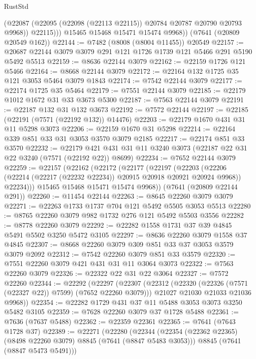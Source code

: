 \begin{lexlean}{RustStd}
\begin{coremodule}
{\begin{coremodule}
{{{{{{{{{{{{{{{{{{{{{{{{{{{{{{{{              (@22087 (@22095 (@22098 (@22113 @22115)) @20784 @20787 @20790 @20793 @9968))
              @22115)))
        @15465
        @15468
        @15471
        @15474
        @9968))
    (@7641 (@20809 @20549 @162))
@22144 := @7482 (@8008 (@8004 @11455)) @20549
@22157 := @20687 @22144 @3079 @3079 @291 @121 @1726 @1739 @121 @5466 @291 @5190 @5492 @5513
@22159 := @8636 @22144 @3079
@22162 := @22159 @1726 @121 @5466
@22164 := @8668 @22144 @3079
@22172 := @22164 @132 @1725 @35 @121 @3053 @5464 @3079 @1843
@22174 := @7542 @22144 @3079
@22177 := @22174 @1725 @35 @5464
@22179 := @7551 @22144 @3079
@22185 := @22179 @1012 @1672 @31 @33 @3673 @5300
@22187 := @7563 @22144 @3079
@22191 := @22187 @132 @31 @132 @3673
@22192 := @7572 @22144
@22197 := @22185 (@22191 (@7571 (@22192 @132)) @14476)
@22203 := @22179 @1670 @431 @31 @11 @5298 @3073
@22206 := @22159 @1670 @31 @5298
@22214 := @22164 @339 @851 @33 @31 @3053 @3570 @3079 @2185
@22217 := @22174 @851 @33 @3570
@22232 := @22179 @421 @431 @31 @11 @3240 @3073 (@22187 @22 @31 @22 @3240 (@7571 (@22192 @22)) @8699)
@22234 := @7652 @22144 @3079
@22259 := @22157
    (@22162
      (@22172
        (@22177
          (@22197
            (@22203
              (@22206 (@22214 (@22217 (@22232 @22234)) @20915 @20918 @20921 @20924 @9968))
              @22234)))
        @15465
        @15468
        @15471
        @15474
        @9968))
    (@7641 (@20809 @22144 @291))
@22260 := @11454 @22144
@22263 := @8645 @22260 @3079 @3079
@22271 := @22263 @1733 @1737 @704 @121 @5492 @5505 @3053 @5513
@22280 := @8765 @22260 @3079 @982 @1732 @276 @121 @5492 @5503 @3556
@22282 := @8778 @22260 @3079
@22292 := @22282 @1558 @1731 @37 @39 @4845 @5491 @5502 @3250 @5472 @3105
@22297 := @8636 @22260 @3079 @1558 @37 @4845
@22307 := @8668 @22260 @3079 @309 @851 @33 @37 @3053 @3579 @3079 @2092
@22312 := @7542 @22260 @3079 @851 @33 @3579
@22320 := @7551 @22260 @3079 @421 @431 @31 @11 @3064 @3073
@22322 := @7563 @22260 @3079
@22326 := @22322 @22 @31 @22 @3064
@22327 := @7572 @22260
@22344 := @22292
    (@22297
      (@22307
        (@22312 (@22320 (@22326 (@7571 (@22327 @22)) @7599) (@7652 @22260 @3079)))
        @21027
        @21030
        @21033
        @21036
        @9968))
@22354 := @22282 @1729 @431 @37 @11 @5488 @3053 @3073 @3250 @5482 @3105
@22359 := @7628 @22260 @3079 @37 @1728 @5488
@22361 := @7636 (@7637 @5488)
@22362 := @22359 @22361
@22365 := @7641 (@7643 @1728 @37)
@22389 := @22271
    (@22280
      (@22344
        (@22354 (@22362 @22365) (@8498 @22260 @3079) @8845 (@7641 (@8847 @5483 @3053)))
        @8845
        (@7641 (@8847 @5473 @5491)))
}}}}}}}}}}}}}}}}}}}}}}}}}}}}}}}}
\end{coremodule}}
\end{coremodule}
\end{lexlean}
